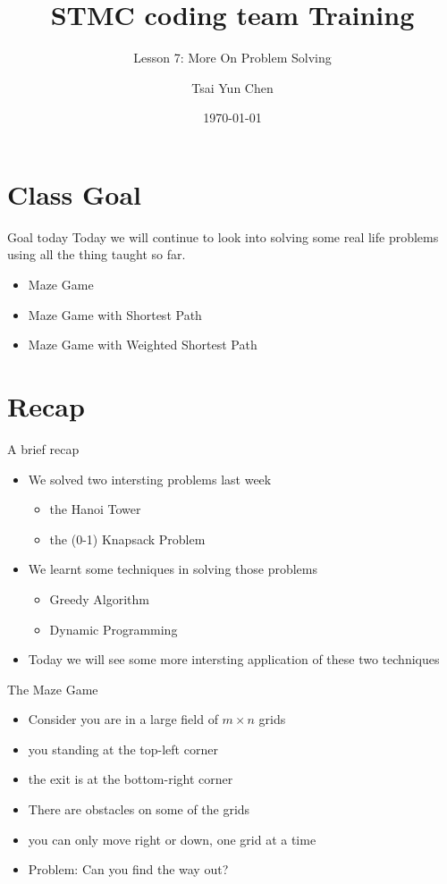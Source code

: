 \documentclass[10pt,xcolor={table,dvipsnames},t]{beamer}
\title[Your Short Title]{STMC coding team Training}
\subtitle{Lesson 7: More On Problem Solving}
\author{Tsai Yun Chen}
\date{\today}
\begin{document}
\begin{frame}
  \titlepage
\end{frame}


\section{Class Goal}

\begin{frame}{Goal today}
Today we will continue to look into solving some real life problems using all the thing taught so far.
\begin{itemize}
  \item Maze Game
  \item Maze Game with Shortest Path
  \item Maze Game with Weighted Shortest Path
\end{itemize}
\end{frame}


\section{Recap}
\begin{frame}[fragile]{A brief recap}
  \begin{itemize}
    \item We solved two intersting problems last week
    \begin{itemize}
      \item the Hanoi Tower
      \item the (0-1) Knapsack Problem
    \end{itemize}
    \item We learnt some techniques in solving those problems
    \begin{itemize}
      \item Greedy Algorithm
      \item Dynamic Programming
    \end{itemize}
    \item Today we will see some more intersting application of these two techniques
  \end{itemize}
\end{frame}

\begin{frame}{The Maze Game}
  \begin{itemize}
    \item Consider you are in a large field of $m\times n$ grids
    \item you standing at the top-left corner
    \item the exit is at the bottom-right corner
    \item There are obstacles on some of the grids
    \item you can only move right or down, one grid at a time
    \item Problem: Can you find the way out?
  \end{itemize}
\end{frame}
\end{document}
